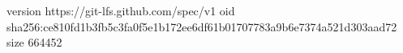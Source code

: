 version https://git-lfs.github.com/spec/v1
oid sha256:ce810fd1b3fb5c3fa0f5e1b172ee6df61b01707783a9b6e7374a521d303aad72
size 664452
